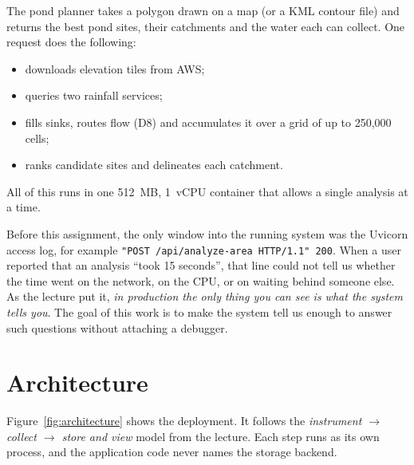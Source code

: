 \documentclass[manuscript,screen]{acmart}
\begin{document}
The pond planner takes a polygon drawn on a map (or a KML contour file) and
returns the best pond sites, their catchments and the water each can
collect. One request does the following:
\begin{itemize}
\item downloads elevation tiles from AWS;
\item queries two rainfall services;
\item fills sinks, routes flow (D8) and accumulates it over a grid of up to
  250{,}000 cells;
\item ranks candidate sites and delineates each catchment.
\end{itemize}
All of this runs in one 512~MB, 1~vCPU container that allows a single
analysis at a time.

Before this assignment, the only window into the running system was the
Uvicorn access log, for example
\texttt{"POST /api/analyze-area HTTP/1.1" 200}. When a user reported that an
analysis ``took 15 seconds'', that line could not tell us whether the time
went on the network, on the CPU, or on waiting behind someone else. As
the lecture put it, \emph{in production the only thing you can see is what
the system tells you}. The goal of this work is to make the system tell us
enough to answer such questions without attaching a debugger.

\section{Architecture}
\label{sec:architecture}

Figure~\ref{fig:architecture} shows the deployment. It follows the
\emph{instrument $\rightarrow$ collect $\rightarrow$ store and view} model
from the lecture. Each step runs as its own process, and the application
code never names the storage backend.
\end{document}
